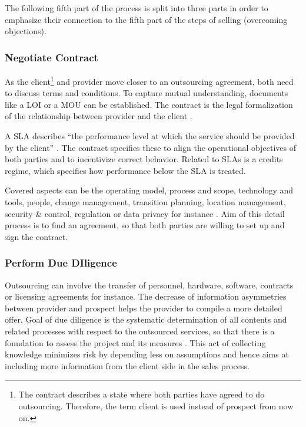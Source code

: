 	The following fifth part of the process is split into three parts in order to emphasize their connection to the fifth part of the steps of selling (overcoming objections). 
	
	
	\subsubsection{Negotiate Contract}
	
	As the client\footnote{The contract describes a state where both parties have agreed to do outsourcing. Therefore, the term client is used instead of prospect from now on.} and provider move closer to an outsourcing agreement, both need to discuss terms and conditions. To capture mutual understanding, documents like a \acrfull{LOI} or a \acrfull{MOU} can be established. The contract is the legal formalization of the relationship between provider and the client \citep{Franceschini_2003}. 
	
	A \acrfull{SLA} describes \enquote{the performance level at which the service should be provided by the client} \citep[]{deloittehandbook}. The contract specifies these to align the operational objectives of both parties and to incentivize correct behavior. Related to \acrshort{SLA}s is a credits regime, which specifies how performance below the \acrshort{SLA} is treated. 
	
	Covered aspects can be the operating model, process and scope, technology and tools, people, change management, transition planning, location management, security \& control, regulation or data privacy for instance \citep{deloittehandbook}. Aim of this detail process is to find an agreement, so that both parties are willing to set up and sign the contract.
	
	
	\subsubsection{Perform Due DIligence}
	
	Outsourcing can involve the transfer of personnel, hardware, software, contracts or licensing agreements for instance. The decrease of information asymmetries between provider and prospect helps the provider to compile a more detailed offer. Goal of due diligence is the systematic determination of all contents and related processes with respect to the outsourced services, so that there is a foundation to assess the project and its measures \citep[]{bitkom2008}. This act of collecting knowledge minimizes risk by depending less on assumptions and hence aims at including more information from the client side in the sales process. 
	
